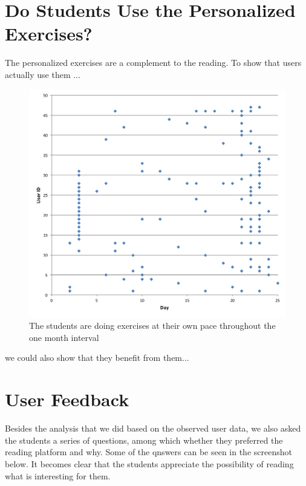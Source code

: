 \section{Do Students Use the Personalized Exercises?}

The personalized exercises are a complement to the reading. To show that 
users actually use them ... 

\begin{figure}[h!]
\centering
  \includegraphics[width=\columnwidth]{figures/user_exercise_activity_vs_day.pdf}
  \caption{The students are doing exercises at their own pace throughout the one month interval }
\end{figure}

we could also show that they benefit from them... 



\section{User Feedback}

Besides the analysis that we did based on the observed user data, we also asked the students a series of questions, among which whether they preferred the reading platform and why. Some of the qnswers can be seen in the screenshot below. It becomes clear that the students appreciate the possibility of reading what is interesting for them.

